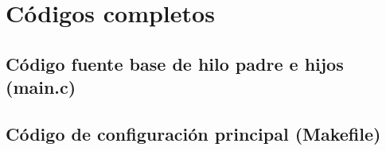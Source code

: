 %
%

\appendix
\renewcommand{\appendixname}{Anexo}
\renewcommand{\appendixpagename}{Anexos}
\renewcommand{\appendixtocname}{Anexos}
\addappheadtotoc
\appendixpage

\chapter{Códigos completos}
\label{chap:codigos_completos}



\section{Código fuente base de hilo padre e hijos (main.c)}


\section{Código de configuración principal (Makefile)}


% 





